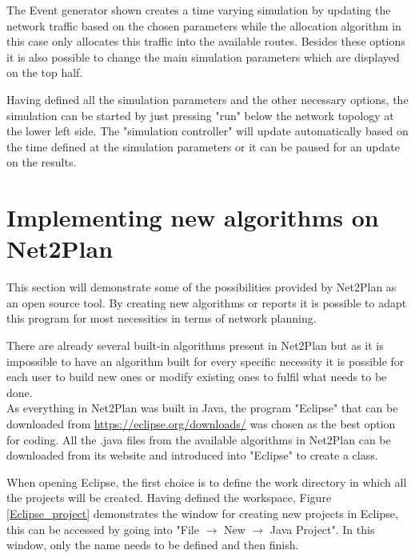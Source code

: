 	The Event generator shown creates a time varying simulation by updating the network traffic based on the chosen parameters while the allocation algorithm in this case only allocates this traffic into the available routes. Besides these options it is also possible to change the main simulation parameters which are displayed on the top half.

	Having defined all the simulation parameters and the other necessary options, the simulation can be started by just pressing "run" below the network topology at the lower left side. The "simulation controller" will update automatically based on the time defined at the simulation parameters or it can be paused for an update on the results.
	
	\newpage

	\section*{Implementing new algorithms on Net2Plan}
	\vspace{1cm}
	This section will demonstrate some of the possibilities provided by Net2Plan as an open source tool. By creating new algorithms or reports it is possible to adapt this program for most necessities in terms of network planning.

	There are already several built-in algorithms present in Net2Plan but as it is impossible to have an algorithm built for every specific necessity it is possible for each user to build new ones or modify existing ones to fulfil what needs to be done.\\
	
	As everything in Net2Plan was built in Java, the program "Eclipse" that can be downloaded from \url{https://eclipse.org/downloads/} was chosen as the best option for coding. All the .java files from the available algorithms in Net2Plan can be downloaded from its website and introduced into "Eclipse" to create a class.
	
	When opening Eclipse, the first choice is to define the work directory in which all the projects will be created. Having defined the workspace, Figure \ref{Eclipse_project} demonstrates the window for creating new projects in Eclipse, this can be accessed by going into "File $\rightarrow$ New $\rightarrow$ Java Project". In this window, only the name needs to be defined and then finish.
	
